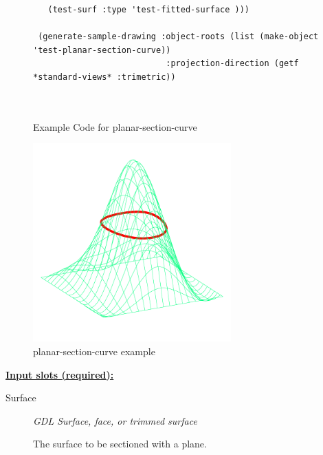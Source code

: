 \documentclass [11pt]{book}
\begin{document}
\begin{itemize}
\begin{figure}
\begin{lrbox}{\boxedverb}
\begin{minipage}{\linewidth}
{\begin{verbatim}
   (test-surf :type 'test-fitted-surface )))

 (generate-sample-drawing :object-roots (list (make-object 'test-planar-section-curve))
                           :projection-direction (getf *standard-views* :trimetric))

 
\end{verbatim}}
\end{minipage}
\end{lrbox}
\fbox{\usebox{\boxedverb}}

\caption{Example Code for planar-section-curve}

\label{fig:example-code-planar-section-curve}

\end{figure}

\begin{figure}
\begin{center}
\includegraphics[width=3in,height=3in]{../images/example-planar-section-curve.pdf}
\end{center}

\caption{planar-section-curve example}

\label{fig:planar-section-curve}

\end{figure}





\textbf{
\underline{Input slots (required):}}

\begin{description}

\item [Surface]
\emph{GDL Surface, face, or trimmed surface}

 The surface to be sectioned with a plane.





\end{description}
\end{itemize}
\end{document}
